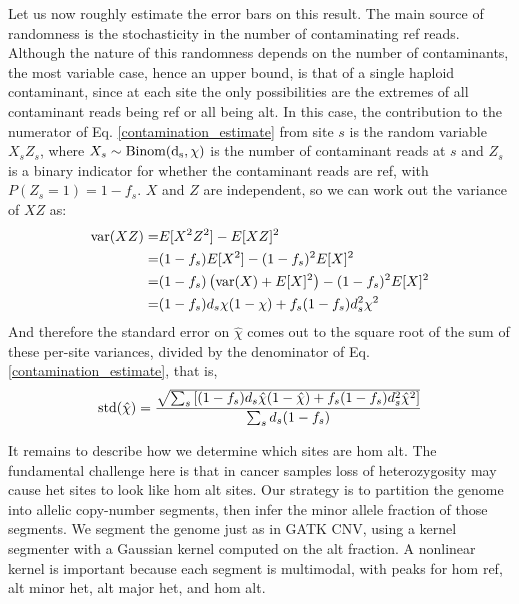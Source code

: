 \documentclass[nofootinbib,amssymb,amsmath]{revtex4}
\begin{document}
Let us now roughly estimate the error bars on this result.  The main source of randomness is the stochasticity in the number of contaminating ref reads.  Although the nature of this randomness depends on the number of contaminants, the most variable case, hence an upper bound, is that of a single haploid contaminant, since at each site the only possibilities are the extremes of all contaminant reads being ref or all being alt.  In this case, the contribution to the numerator of Eq. \ref{contamination_estimate} from site $s$ is the random variable $X_sZ_s$, where $X_s \sim {\rm Binom(d_s, \chi)}$ is the number of contaminant reads at $s$ and $Z_s$ is a binary indicator for whether the contaminant reads are ref, with $P(Z_s=1) = 1 - f_s$.  $X$ and $Z$ are independent, so we can work out the variance of $XZ$ as:
\begin{align}
{\rm var}(XZ) =& E[X^2Z^2] - E[XZ]^2 \\
=& (1 - f_s) E[X^2] - (1-f_s)^2 E[X]^2 \\
=& (1 - f_s) \left( {\rm var}(X) + E[X]^2 \right) - (1 - f_s)^2E[X]^2 \\
=& (1 - f_s) d_s \chi(1 - \chi) + f_s(1 - f_s) d_s^2 \chi^2
\end{align}
And therefore the standard error on $\hat{\chi}$ comes out to the square root of the sum of these per-site variances, divided by the denominator of Eq. \ref{contamination_estimate}, that is,
\begin{equation}
{\rm std}(\hat \chi) = \frac{\sqrt{  \sum_s \left[ (1 - f_s) d_s \hat{\chi}(1 - \hat{\chi}) + f_s(1 - f_s) d_s^2 \hat{\chi}^2  \right] }}{\sum_s d_s (1 - f_s) }
\end{equation}

It remains to describe how we determine which sites are hom alt.  The fundamental challenge here is that in cancer samples loss of heterozygosity may cause het sites to look like hom alt sites.  Our strategy is to partition the genome into allelic copy-number segments, then infer the minor allele fraction of those segments.  We segment the genome just as in GATK CNV, using a kernel segmenter with a Gaussian kernel computed on the alt fraction.  A nonlinear kernel is important because each segment is multimodal, with peaks for hom ref, alt minor het, alt major het, and hom alt.  
\end{document}
